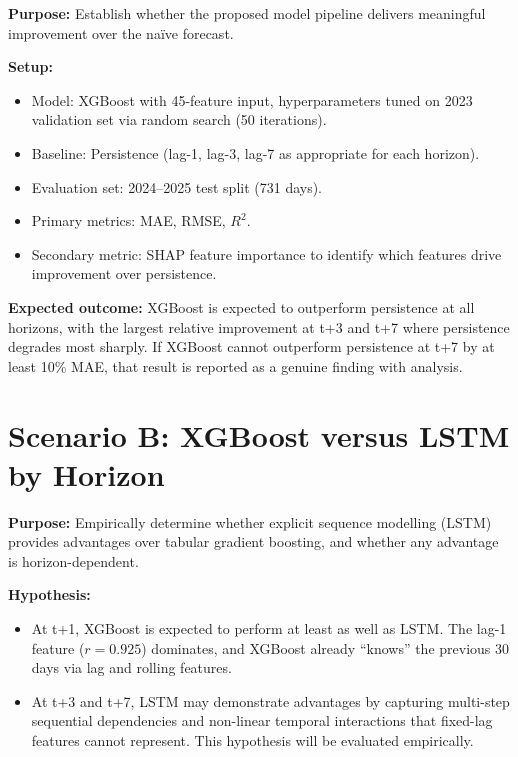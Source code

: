 \documentclass[12pt,a4paper]{report}
\begin{document}
\textbf{Purpose:} Establish whether the proposed model pipeline delivers meaningful improvement over the na\"ive forecast.

\textbf{Setup:}
\begin{itemize}
  \item Model: XGBoost with 45-feature input, hyperparameters tuned on 2023 validation set via random search (50 iterations).
  \item Baseline: Persistence (lag-1, lag-3, lag-7 as appropriate for each horizon).
  \item Evaluation set: 2024--2025 test split (731 days).
  \item Primary metrics: MAE, RMSE, $R^2$.
  \item Secondary metric: SHAP feature importance to identify which features drive improvement over persistence.
\end{itemize}

\textbf{Expected outcome:} XGBoost is expected to outperform persistence at all horizons, with the largest relative improvement at t+3 and t+7 where persistence degrades most sharply. If XGBoost cannot outperform persistence at t+7 by at least 10\% MAE, that result is reported as a genuine finding with analysis.

\section{Scenario B: XGBoost versus LSTM by Horizon}

\textbf{Purpose:} Empirically determine whether explicit sequence modelling (LSTM) provides advantages over tabular gradient boosting, and whether any advantage is horizon-dependent.

\textbf{Hypothesis:}
\begin{itemize}
  \item At t+1, XGBoost is expected to perform at least as well as LSTM. The lag-1 feature ($r = 0.925$) dominates, and XGBoost already ``knows'' the previous 30 days via lag and rolling features.
  \item At t+3 and t+7, LSTM may demonstrate advantages by capturing multi-step sequential dependencies and non-linear temporal interactions that fixed-lag features cannot represent. This hypothesis will be evaluated empirically.
\end{itemize}
\end{document}
